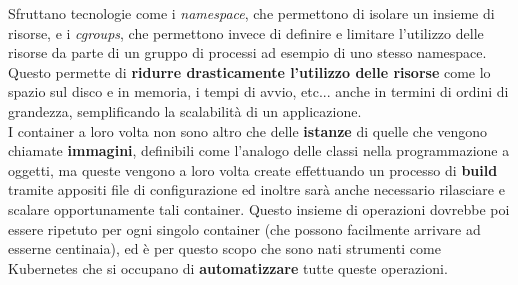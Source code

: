 Sfruttano tecnologie come i \textit{namespace}, che permettono di isolare un insieme di risorse, e i \textit{cgroups}, che permettono invece di definire e limitare l'utilizzo delle risorse da parte di un gruppo di processi ad esempio di uno stesso namespace. Questo permette di \textbf{ridurre drasticamente l'utilizzo delle risorse} come lo spazio sul disco e in memoria, i tempi di avvio, etc... anche in termini di ordini di grandezza, semplificando la scalabilità di un applicazione.
\\
I container a loro volta non sono altro che delle \textbf{istanze} di quelle che vengono chiamate \textbf{immagini},
definibili come l'analogo delle classi nella programmazione a oggetti, ma queste vengono a loro volta create effettuando un processo di \textbf{build} tramite appositi file di configurazione ed inoltre sarà anche necessario rilasciare e scalare opportunamente tali container. Questo insieme di operazioni dovrebbe poi essere ripetuto per ogni singolo container (che possono facilmente arrivare ad esserne centinaia), ed è per questo scopo che sono nati strumenti come Kubernetes che si occupano di \textbf{automatizzare} tutte queste operazioni.

